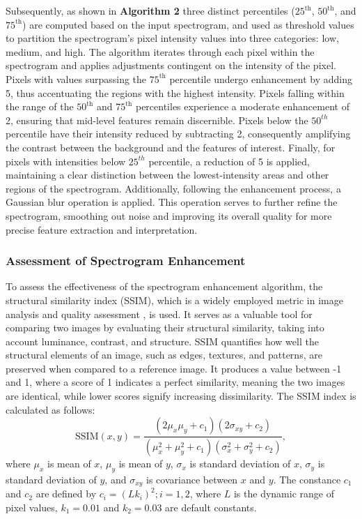 \documentclass[applsci,article,accept,moreauthors,pdftex]{Definitions/mdpi}
\begin{document}
Subsequently, as shown in {\bf Algorithm 2} three distinct percentiles ($25^{\text{th}}$, $50^{\text{th}}$, and $75^{\text{th}}$) are computed based on the input spectrogram, and used as threshold values to partition the spectrogram's pixel intensity values into three categories: low, medium, and high.
The algorithm iterates through each pixel within the spectrogram and applies adjustments contingent on the intensity of the pixel. Pixels with values surpassing the $75^{\text{th}}$ percentile undergo enhancement by adding 5, thus accentuating the regions with the highest intensity. Pixels falling within the range of the $50^{\text{th}}$ and $75^{\text{th}}$ percentiles experience a moderate enhancement of 2, ensuring that mid-level features remain discernible. Pixels below the $50^{th}$ percentile have their intensity reduced by subtracting 2, consequently amplifying the contrast between the background and the features of interest. Finally, for pixels with intensities below $25^{th}$ percentile, a reduction of 5 is applied, maintaining a clear distinction between the lowest-intensity areas and other regions of the spectrogram.
Additionally, following the enhancement process, a Gaussian blur operation is applied. This operation serves to further refine the spectrogram, smoothing out noise and improving its overall quality for more precise feature extraction and interpretation.

\subsubsection{Assessment of Spectrogram Enhancement}
To assess the effectiveness of the spectrogram enhancement algorithm, the structural similarity index (SSIM), which is a widely employed metric in image analysis and quality assessment \cite{wang2004image}, is used. It serves as a valuable tool for comparing two images by evaluating their structural similarity, taking into account luminance, contrast, and structure. SSIM quantifies how well the structural elements of an image, such as edges, textures, and patterns, are preserved when compared to a reference image. It produces a value between -1 and 1, where a score of 1 indicates a perfect similarity, meaning the two images are identical, while lower scores signify increasing dissimilarity. The SSIM index is calculated as follows:
\begin{equation}
	\text{SSIM}(x, y) = \frac{{(2\mu_x\mu_y + c_1)(2\sigma_{xy} + c_2)}}{{(\mu_x^2 + \mu_y^2 + c_1)(\sigma_x^2 + \sigma_y^2 + c_2)}},
\end{equation}
where $\mu_x$ is mean of $x$, $\mu_y$ is mean of $y$, $\sigma_x$ is standard deviation of $x$, $\sigma_y$ is standard deviation of $y$, and $\sigma_{xy}$ is covariance between $x$ and $y$. The constance $c_1$ and $c_2$ are defined by $c_i=(Lk_i)^2; i=1,2$, where $L$ is the dynamic range of pixel values, $k_1=0.01$ and $k_2= 0.03$ are default constants.
\end{document}
